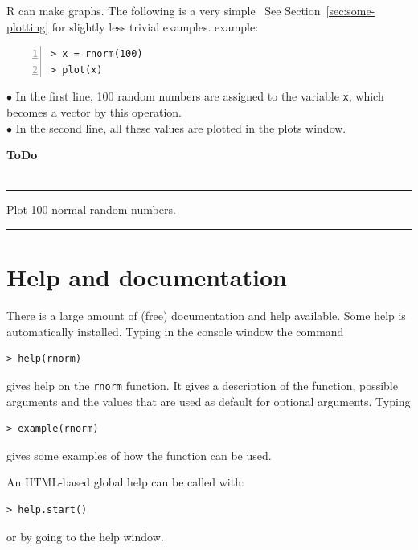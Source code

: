 \documentclass[a4paper,11pt,twocolumn,tablecaptionabove]{scrartcl}
\makeatletter
\newenvironment{ToDo} {%
  \begin{flushright}
    \hfill
    \begin{minipage}{0.95\columnwidth}         %
    \textsf{\textbf{ToDo}} \\
      \vspace{-0.85cm}\\
      {\color{Gray}\rule[-0.1cm]{\columnwidth}{1.5pt}}} { %
      {\color{Gray} \rule[0.3cm]{\columnwidth}{1.5pt}}
    \end{minipage}
    \vspace{1em}
  \end{flushright}
  }
\let\SF@@footnote\footnote
\def\footnote{\ifx\protect\@typeset@protect
 \expandafter\SF@@footnote
 \else
 \expandafter\SF@gobble@opt
 \fi
}
\edef\SF@gobble@opt{\noexpand\protect
 \expandafter\noexpand\csname SF@gobble@opt \endcsname}
\makeatother
\begin{document}
R can make graphs. The following is a very simple~\footnote{See Section~\ref{sec:some-plotting} for slightly less trivial examples.}
example:
\begin{Verbatim}[frame=single,numbers=left,gobble=0, xleftmargin=0.35cm, numbersep=0.1cm]
> x = rnorm(100)
> plot(x)
\end{Verbatim}

\noindent $\bullet$ In the first line, 100 random numbers are assigned to the variable \texttt{x}, which becomes a vector by this operation. \\
\noindent $\bullet$ In the second line, all these
values are  plotted in the plots window.\\

\begin{ToDo}
Plot 100 normal random numbers.\\
\end{ToDo}


\section{Help and documentation}
\label{sec:help}

There is a large amount of (free) documentation and help available. 
Some help is automatically installed. Typing in the console window the command
\begin{Verbatim}[frame=single,gobble=0]
> help(rnorm)
\end{Verbatim}
gives help on the \texttt{rnorm} function. It gives a description of the function, possible arguments and the values that are used as default for optional arguments. Typing
\begin{Verbatim}[frame=single,gobble=0]
> example(rnorm)
\end{Verbatim}
gives some examples of how the function can be used. 

An HTML-based global help can be called with:
\begin{Verbatim}[frame=single,gobble=0]
> help.start()
\end{Verbatim}
or by going to the help window.
\end{document}
